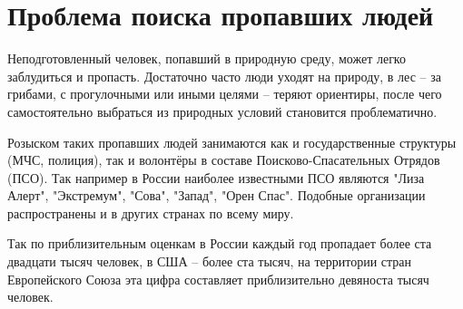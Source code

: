 \section{Проблема поиска пропавших людей}

Неподготовленный человек, попавший в природную среду, может легко заблудиться и пропасть. Достаточно часто люди уходят на природу, в лес -- за грибами, с прогулочными или иными целями -- теряют ориентиры, после чего самостоятельно выбраться из природных условий становится проблематично.

Розыском таких пропавших людей занимаются как и государственные структуры (МЧС, полиция), так и волонтёры в составе Поисково-Спасательных Отрядов (ПСО). Так например в России наиболее известными ПСО являются "Лиза Алерт", "Экстремум", "Сова", "Запад", "Орен Спас". Подобные организации распространены и в других странах по всему миру.

Так по приблизительным оценкам в России каждый год пропадает более ста двадцати тысяч человек, в США -- более ста тысяч, на территории стран Европейского Союза эта цифра составляет приблизительно девяноста тысяч человек.





\clearpage